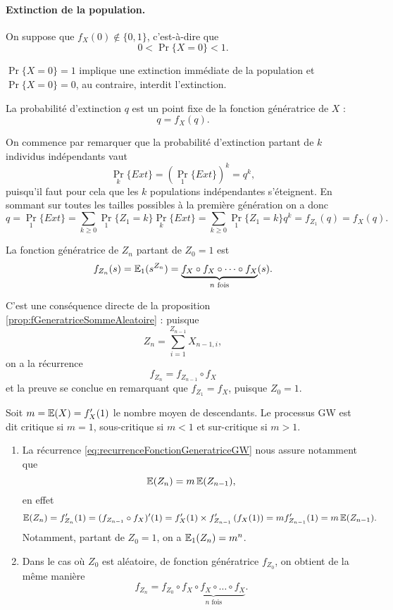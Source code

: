 \paragraph*{Extinction de la population.} 
On suppose que $f_X(0) \notin \{0, 1\}$, c'est-à-dire que 
$$
0 < \Pr\{X = 0\} < 1.
$$

\remark
$\Pr\{X = 0\} = 1$ implique une extinction immédiate de la population et $\Pr\{X = 0\} = 0$, au contraire, interdit l'extinction.

\begin{proposition}
  La probabilité d'extinction $q$ est un point fixe de la fonction génératrice de $X$ :
  $$
  q = f_X(q).
  $$
\end{proposition}

\proof
On commence par remarquer que la probabilité d'extinction partant de $k$ individus indépendants vaut
$$
\Pr_k\{Ext\} = \left(\Pr_1\{Ext\}\right)^k = q^k,
$$
puisqu'il faut pour cela que les $k$ populations indépendantes s'éteignent. En sommant sur toutes les tailles possibles à la première génération on a donc
$$
q 
= \Pr_1\{Ext\} 
= \sum_{k \geq 0} \Pr_1\{Z_1 = k\} \Pr_k\{Ext\}
= \sum_{k \geq 0} \Pr_1\{Z_1 = k\} q^k
= f_{Z_1}(q)
= f_X(q).
$$

\begin{proposition} \label{prop:fonctionGeneratriceZn}
  La fonction génératrice de $Z_n$ partant de $Z_0 = 1$ est
  $$
  f_{Z_n}(s) = \operatorname{\mathbb{E}}_1(s^{Z_n}) = \underset{n \text{ fois}}{\underbrace{f_X \circ f_X \circ \dots \circ f_X}}(s).
  $$
\end{proposition}

\proof 
C'est une conséquence directe de la proposition \ref{prop:fGeneratriceSommeAleatoire} : puisque
$$
Z_n = \sum_{i=1}^{Z_{n-1}} X_{n-1, i},
$$
on a la récurrence 
\begin{equation} \label{eq:recurrenceFonctionGeneratriceGW}
f_{Z_n} = f_{Z_{n-1}} \circ f_X
\end{equation}
et la preuve se conclue en remarquant que $f_{Z_1} = f_X$, puisque $Z_0 = 1$.
\eproof

\begin{definition}
  Soit $m = \operatorname{\mathbb{E}}(X) = f'_X(1)$ le nombre moyen de descendants. Le processus GW est dit critique si $m=1$, sous-critique si $m < 1$ et sur-critique si $m > 1$.
\end{definition}

\remarks
\begin{enumerate}
  \item La récurrence \eqref{eq:recurrenceFonctionGeneratriceGW} nous assure notamment que
  $$
  \operatorname{\mathbb{E}}(Z_n) = m \operatorname{\mathbb{E}}(Z_{n-1}),
  $$
  en effet
  \begin{align*}
    \operatorname{\mathbb{E}}(Z_n) 
    = f'_{Z_n}(1) = (f_{Z_{n-1}} \circ f_X)'(1) 
    = f'_X(1) \times f'_{Z_{n-1}}\left(f_X(1)\right) 
    = m f'_{Z_{n-1}}(1) = m \operatorname{\mathbb{E}}(Z_{n-1}).
  \end{align*}
  Notamment, partant de $Z_0 = 1$, on a $\operatorname{\mathbb{E}}_1(Z_n) = m^n$.
  \item Dans le cas où $Z_0$ est aléatoire, de fonction génératrice $f_{Z_0}$, on obtient de la même manière
  $$
  f_{Z_n} =  f_{Z_0} \circ \underset{n \text{ fois}}{\underbrace{f_X \circ f_X \circ \dots \circ f_X}}.
  $$
\end{enumerate}

